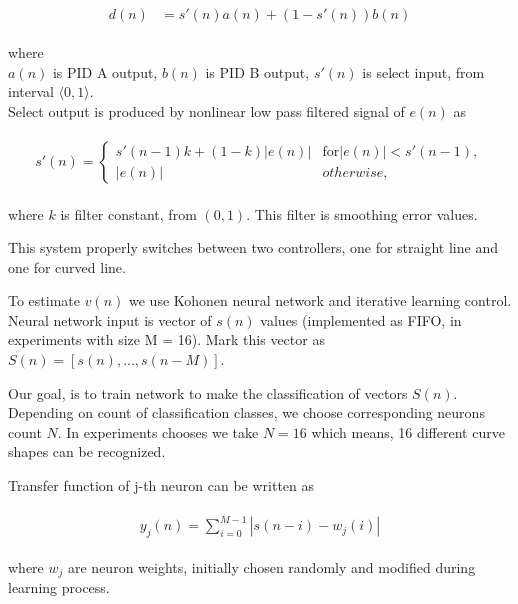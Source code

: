 \documentclass[twoside]{oss-conf-eng}
\begin{document}
\begin{eqnarray}
\begin{split}
\label{fuzzy_mux}
	d(n) &= s'(n)a(n) + (1 - s'(n))b(n)
\end{split}
\end{eqnarray}

where \\
$a(n)$ is PID A output,
$b(n)$ is PID B output,
$s'(n)$ is select input, from interval $\langle 0, 1 \rangle$. \\

Select output is produced by nonlinear low pass filtered signal of $e(n)$ as

\begin{eqnarray}
\begin{split}
\label{low_pass}
s'(n) =
  \begin{cases}
    s'(n-1)k + (1 - k)|e(n)| & \text{for} |e(n)| < s'(n-1), \\
    |e(n)| & otherwise,
  \end{cases}
\end{split}
\end{eqnarray}

where $k$ is filter constant, from $(0, 1)$. This filter is smoothing error
values.

This system properly switches between two controllers, one for straight line and
one for curved line.

To estimate $v(n)$ we use Kohonen neural network \cite{kohonen_neural_network}
 and iterative learning control. Neural network input is vector of $s(n)$ values
(implemented as FIFO, in experiments with size M = 16). Mark this vector as $S(n) =
[s(n), ..., s(n - M)]$.

Our goal, is to train network to make the classification of vectors $S(n)$. Depending on count of classification classes,
we choose corresponding neurons count $N$. In experiments chooses we take $N=16$ which means, 16 different
curve shapes can be recognized.

Transfer function of j-th neuron can be written as

\begin{eqnarray}
\begin{split}
\label{neuron_transfer}
y_j(n) = \sum_{i = 0}^{M-1} {|s(n-i) - w_j(i)|}
\end{split}
\end{eqnarray}

where $w_j$ are neuron weights, initially chosen randomly
 and modified during learning process.
\end{document}
